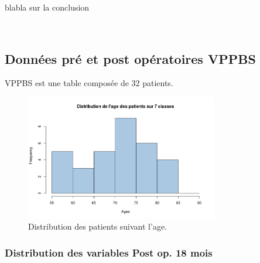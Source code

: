 blabla sur la conclusion

\newpage
~
\newpage













\subsection{Données pré et post opératoires VPPBS }


VPPBS est une table composée de 32 patients. 

\begin{figure}[!h]
\centering
\includegraphics[width=0.75\textwidth]{../Fig/VPPBS/vppbs-age-frequency.png}
\caption{Distribution des patients suivant l'age.}
\end{figure}

\subsubsection{Distribution des variables Post op. 18 mois}

